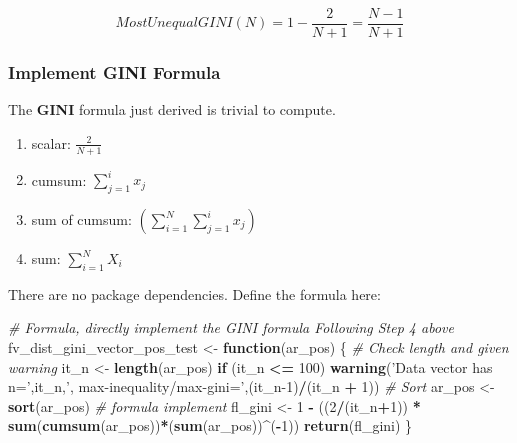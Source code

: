 \documentclass[
]{book}
\newenvironment{Shaded}{\begin{snugshade}}{\end{snugshade}}
\newcommand{\CommentTok}[1]{\textcolor[rgb]{0.56,0.35,0.01}{\textit{#1}}}
\newcommand{\ControlFlowTok}[1]{\textcolor[rgb]{0.13,0.29,0.53}{\textbf{#1}}}
\newcommand{\DecValTok}[1]{\textcolor[rgb]{0.00,0.00,0.81}{#1}}
\newcommand{\KeywordTok}[1]{\textcolor[rgb]{0.13,0.29,0.53}{\textbf{#1}}}
\newcommand{\NormalTok}[1]{#1}
\newcommand{\OperatorTok}[1]{\textcolor[rgb]{0.81,0.36,0.00}{\textbf{#1}}}
\newcommand{\StringTok}[1]{\textcolor[rgb]{0.31,0.60,0.02}{#1}}
\providecommand{\tightlist}{%
  \setlength{\itemsep}{0pt}\setlength{\parskip}{0pt}}
\begin{document}
\[
 MostUnequalGINI\left(N\right) = 1 - \frac{2}{N+1} = \frac{N-1}{N+1}
\]

\hypertarget{implement-gini-formula}{%
\subsubsection{Implement GINI Formula}\label{implement-gini-formula}}

The \textbf{GINI} formula just derived is trivial to compute.

\begin{enumerate}
\def\labelenumi{\arabic{enumi}.}
\tightlist
\item
  scalar: \(\frac{2}{N+1}\)
\item
  cumsum: \(\sum_{j=1}^{i} x_j\)
\item
  sum of cumsum: \(\left(\sum_{i=1}^N \sum_{j=1}^{i} x_j\right)\)
\item
  sum: \(\sum_{i=1}^N X_i\)
\end{enumerate}

There are no package dependencies. Define the formula here:

\begin{Shaded}
\begin{Highlighting}[]
\CommentTok{# Formula, directly implement the GINI formula Following Step 4 above}
\NormalTok{fv_dist_gini_vector_pos_test <-}\StringTok{ }\ControlFlowTok{function}\NormalTok{(ar_pos) \{}
  \CommentTok{# Check length and given warning}
\NormalTok{  it_n <-}\StringTok{ }\KeywordTok{length}\NormalTok{(ar_pos)}
  \ControlFlowTok{if}\NormalTok{ (it_n }\OperatorTok{<=}\StringTok{ }\DecValTok{100}\NormalTok{)  }\KeywordTok{warning}\NormalTok{(}\StringTok{'Data vector has n='}\NormalTok{,it_n,}\StringTok{', max-inequality/max-gini='}\NormalTok{,(it_n}\DecValTok{-1}\NormalTok{)}\OperatorTok{/}\NormalTok{(it_n }\OperatorTok{+}\StringTok{ }\DecValTok{1}\NormalTok{))}
  \CommentTok{# Sort}
\NormalTok{  ar_pos <-}\StringTok{ }\KeywordTok{sort}\NormalTok{(ar_pos)}
  \CommentTok{# formula implement}
\NormalTok{  fl_gini <-}\StringTok{ }\DecValTok{1} \OperatorTok{-}\StringTok{ }\NormalTok{((}\DecValTok{2}\OperatorTok{/}\NormalTok{(it_n}\OperatorTok{+}\DecValTok{1}\NormalTok{)) }\OperatorTok{*}\StringTok{ }\KeywordTok{sum}\NormalTok{(}\KeywordTok{cumsum}\NormalTok{(ar_pos))}\OperatorTok{*}\NormalTok{(}\KeywordTok{sum}\NormalTok{(ar_pos))}\OperatorTok{^}\NormalTok{(}\OperatorTok{-}\DecValTok{1}\NormalTok{))}
  \KeywordTok{return}\NormalTok{(fl_gini)}
\NormalTok{\}}
\end{Highlighting}
\end{Shaded}
\end{document}
